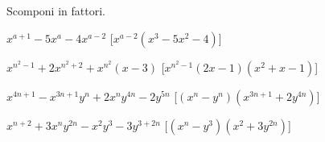 
\begin{esercizio}[\Ast]
 \label{ese:17.45}
 Scomponi in fattori.
 \begin{enumeratea}
  \item \(x^{a+1}-5x^{a}-4x^{a-2}\)
  \hfill [\(x^{a-2}(x^{3}-5x^{2}-4)\)]
\item \(x^{n^{2}-1}+2x^{n^{2}+2}+x^{n^{2}}(x-3)\)
  \hfill [\(x^{n^{2}-1}(2x-1)(x^{2}+x-1)\)]
\item \(x^{4n+1}-x^{3n+1}y^{n}+2x^{n}y^{4n}-2y^{5n}\)
  \hfill [\((x^{n}-y^{n})(x^{3n+1}+2y^{4n})\)]
\item \(x^{n+2}+3x^{n}y^{2n}-x^{2}y^{3}-3y^{3+2n}\)
  \hfill [\((x^{n}-y^{3})(x^{2}+3y^{2n})\)]
 \end{enumeratea}
\end{esercizio}

